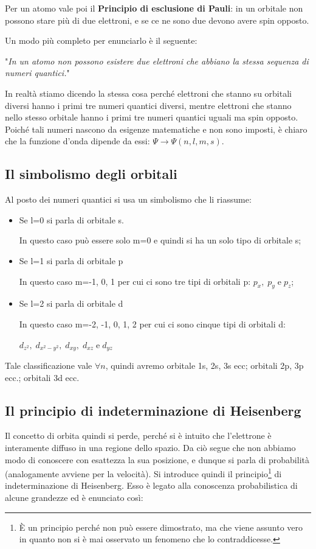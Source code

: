 Per un atomo vale poi il \textbf{Principio di esclusione di Pauli}: in un orbitale non possono stare più di due elettroni, e se ce ne sono due devono avere spin opposto.

Un modo più completo per enunciarlo è il seguente:

"\textit{In un atomo non possono esistere due elettroni che abbiano la stessa sequenza di numeri quantici.}"

In realtà stiamo dicendo la stessa cosa perché elettroni che stanno su orbitali diversi hanno i primi tre numeri quantici diversi, mentre elettroni che stanno nello stesso orbitale hanno i primi tre numeri quantici uguali ma spin opposto.\\

Poiché tali numeri nascono da esigenze matematiche e non sono imposti, è chiaro che la funzione d'onda dipende da essi: $\Psi\rightarrow\Psi(n,l,m,s)$.

\subsection{Il simbolismo degli orbitali}
Al posto dei numeri quantici si usa un simbolismo che li riassume:
\begin{itemize}
\item Se l=0 si parla di orbitale s.

In questo caso può essere solo m=0 e quindi si ha un solo tipo di orbitale s;
\item Se l=1 si parla di orbitale p

In questo caso m=-1, 0, 1 per cui ci sono tre tipi di orbitali p: $p_x, \; p_y \; \text{e} \; p_z$;
\item Se l=2 si parla di orbitale d

In questo caso m=-2, -1, 0, 1, 2 per cui ci sono cinque tipi di orbitali d:

$d_{z^2}, \; d_{x^2-y^2}, \; d_{xy}, \; d_{xz} \; \text{e} \; d_{yz}$
\end{itemize}  
Tale classificazione vale $\forall n$, quindi avremo orbitale 1s, 2s, 3s ecc; orbitali 2p, 3p ecc.; orbitali 3d ecc. 

\subsection{Il principio di indeterminazione di Heisenberg}
Il concetto di orbita quindi si perde, perché si è intuito che l'elettrone è interamente diffuso in una regione dello spazio. Da ciò segue che non abbiamo modo di conoscere con esattezza la sua posizione, e dunque si parla di probabilità (analogamente avviene per la velocità).
Si introduce quindi il principio\footnote{È un principio perché non può essere dimostrato, ma che viene assunto vero in quanto non si è mai osservato un fenomeno che lo contraddicesse.} di indeterminazione di Heisenberg. Esso è legato alla conoscenza probabilistica di alcune grandezze ed è enunciato così:


